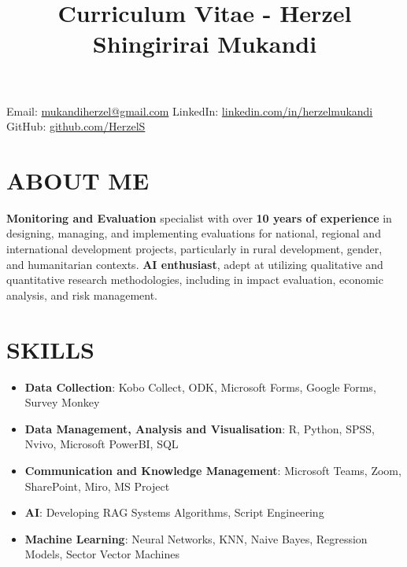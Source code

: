 \documentclass[
  10pt,
]{article}
\title{Curriculum Vitae - Herzel Shingirirai Mukandi}
\author{}
\date{\vspace{-2.5em}}
\begin{document}
\maketitle

\vspace{-2em}

\begin{center}
{\small
Email: \textcolor{blue}{\href{mailto:mukandiherzel@gmail.com}{mukandiherzel@gmail.com}} \quad
LinkedIn: \textcolor{blue}{\href{https://www.linkedin.com/in/herzelmukandi}{linkedin.com/in/herzelmukandi}} \quad
GitHub: \textcolor{blue}{\href{https://github.com/HerzelS}{github.com/HerzelS}}
}
\end{center}

\vspace{0.5em}

\section{ABOUT ME}\label{about-me}

\textbf{Monitoring and Evaluation} specialist with over \textbf{10 years
of experience} in designing, managing, and implementing evaluations for
national, regional and international development projects, particularly in rural development, gender, and humanitarian contexts. \textbf{AI enthusiast}, adept at utilizing qualitative and quantitative research methodologies, including in
impact evaluation, economic analysis, and risk management.

\vspace{0.5cm}

\section{SKILLS}\label{skills}

\begin{itemize}
\item
  \textbf{Data Collection}: Kobo Collect, ODK, Microsoft Forms, Google
  Forms, Survey Monkey
\item
  \textbf{Data Management, Analysis and Visualisation}: R, Python, SPSS,
  Nvivo, Microsoft PowerBI, SQL
\item
  \textbf{Communication and Knowledge Management}: Microsoft Teams,
  Zoom, SharePoint, Miro, MS Project
\item
  \textbf{AI}: Developing RAG Systems Algorithms, Script Engineering
\item
  \textbf{Machine Learning}: Neural Networks, KNN, Naive Bayes,
  Regression Models, Sector Vector Machines
\end{itemize}
\end{document}
